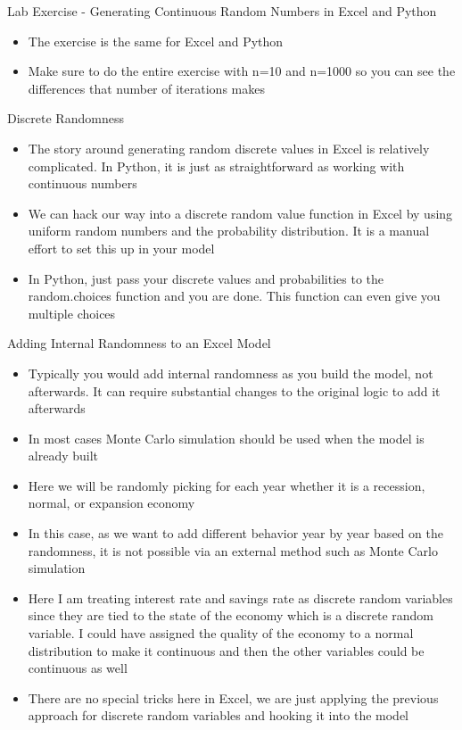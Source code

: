 \documentclass[]{article}
\begin{document}
\begin{section}{Lab Exercise - Generating Continuous Random Numbers in Excel and Python}
\begin{itemize}
\item The exercise is the same for Excel and Python
\item Make sure to do the entire exercise with n=10 and n=1000 so you can see the differences that number of iterations makes
\end{itemize}
\end{section}
\begin{section}{Discrete Randomness}
\begin{itemize}
\item The story around generating random discrete values in Excel is relatively complicated. In Python, it is just as straightforward as working with continuous numbers
\item We can hack our way into a discrete random value function in Excel by using uniform random numbers and the probability distribution. It is a manual effort to set this up in your model
\item In Python, just pass your discrete values and probabilities to the random.choices function and you are done. This function can even give you multiple choices
\end{itemize}
\end{section}
\begin{section}{Adding Internal Randomness to an Excel Model}
\begin{itemize}
\item Typically you would add internal randomness as you build the model, not afterwards. It can require substantial changes to the original logic to add it afterwards
\item In most cases Monte Carlo simulation should be used when the model is already built
\item Here we will be randomly picking for each year whether it is a recession, normal, or expansion economy
\item In this case, as we want to add different behavior year by year based on the randomness, it is not possible via an external method such as Monte Carlo simulation
\item Here I am treating interest rate and savings rate as discrete random variables since they are tied to the state of the economy which is a discrete random variable. I could have assigned the quality of the economy to a normal distribution to make it continuous and then the other variables could be continuous as well
\item There are no special tricks here in Excel, we are just applying the previous approach for discrete random variables and hooking it into the model
\end{itemize}
\end{section}
\end{document}
